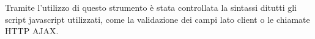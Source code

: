 Tramite l’utilizzo di questo strumento è stata controllata la sintassi ditutti gli script javascript utilizzati, come la validazione dei campi
lato client o le chiamate HTTP AJAX.
